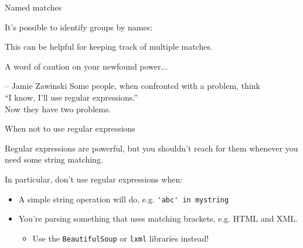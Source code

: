 \documentclass{beamer}
\begin{document}
\begin{frame}{Named matches}

It's possible to identify groups by names:



This can be helpful for keeping track of multiple matches.

\end{frame}

  
\begin{frame}{A word of caution on your newfound power...}

\begin{aquote}{-- Jamie Zawinski}
Some people, when confronted with a problem, think \\ ``I know, I'll use regular expressions.'' \\ Now they have two problems. \newline \newline
\end{aquote}

\end{frame}

\begin{frame}{When not to use regular expressions}

Regular expressions are powerful, but you shouldn't reach for them whenever you need some string matching.

\bigskip

In particular, don't use regular expressions when:
\begin{itemize}
 \item A simple string operation will do, e.g. \lstinline$'abc' in mystring$
 \item You're parsing something that uses matching brackets, e.g. HTML and XML.
   \begin{itemize}
     \item Use the \lstinline$BeautifulSoup$ or \lstinline$lxml$ libraries instead!
   \end{itemize}
\end{itemize}

\end{frame}
\end{document}
